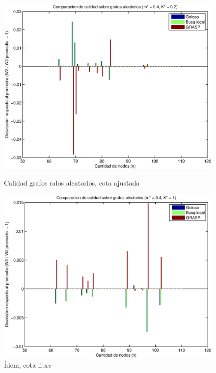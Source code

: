 \begin{figure}[H]
    \begin{minipage}{0.5\linewidth}
      \includegraphics[width=\linewidth]{graficos/todos_calidad_m04_K02.eps}
      \caption{Calidad grafos ralos aleatorios, cota ajustada}\label{fig:ralos-ajustada}
    \end{minipage}
    \hfill
    \begin{minipage}{0.5\linewidth}
      \includegraphics[width=\linewidth]{graficos/todos_calidad_m04_K1.eps}
      \caption{Ídem, cota libre}\label{fig:ralos-libre}
    \end{minipage}    
\end{figure}

